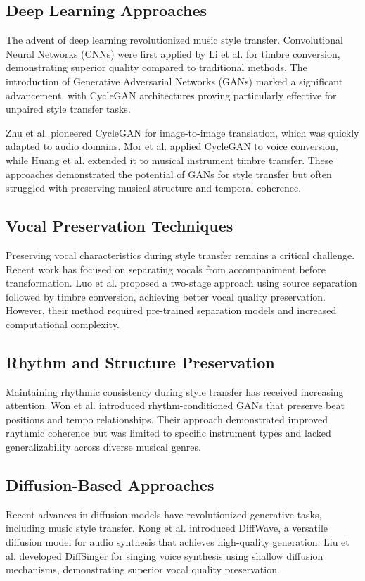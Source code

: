 \documentclass[conference]{IEEEtran}
\begin{document}
\subsection{Deep Learning Approaches}
The advent of deep learning revolutionized music style transfer. Convolutional Neural Networks (CNNs) were first applied by Li et al. \cite{li2016} for timbre conversion, demonstrating superior quality compared to traditional methods. The introduction of Generative Adversarial Networks (GANs) marked a significant advancement, with CycleGAN architectures proving particularly effective for unpaired style transfer tasks.

Zhu et al. \cite{zhu2017} pioneered CycleGAN for image-to-image translation, which was quickly adapted to audio domains. Mor et al. \cite{mor2018} applied CycleGAN to voice conversion, while Huang et al. \cite{huang2018} extended it to musical instrument timbre transfer. These approaches demonstrated the potential of GANs for style transfer but often struggled with preserving musical structure and temporal coherence.

\subsection{Vocal Preservation Techniques}
Preserving vocal characteristics during style transfer remains a critical challenge. Recent work has focused on separating vocals from accompaniment before transformation. Luo et al. \cite{luo2018} proposed a two-stage approach using source separation followed by timbre conversion, achieving better vocal quality preservation. However, their method required pre-trained separation models and increased computational complexity.

\subsection{Rhythm and Structure Preservation}
Maintaining rhythmic consistency during style transfer has received increasing attention. Won et al. \cite{won2019} introduced rhythm-conditioned GANs that preserve beat positions and tempo relationships. Their approach demonstrated improved rhythmic coherence but was limited to specific instrument types and lacked generalizability across diverse musical genres.

\subsection{Diffusion-Based Approaches}
Recent advances in diffusion models have revolutionized generative tasks, including music style transfer. Kong et al. \cite{kong2023} introduced DiffWave, a versatile diffusion model for audio synthesis that achieves high-quality generation. Liu et al. \cite{liu2023} developed DiffSinger for singing voice synthesis using shallow diffusion mechanisms, demonstrating superior vocal quality preservation.
\end{document}
